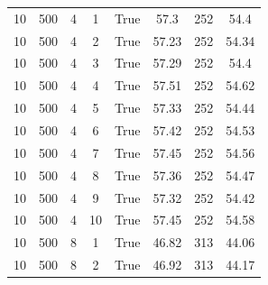 \begin{table}[H]
{\begin{tabular}{cccccccc}
			\midrule
			10            & 500                             & 4                        & 1            & True             & 57.3                   & 252           & 54.4              \\
			10            & 500                             & 4                        & 2            & True             & 57.23                  & 252           & 54.34             \\
			10            & 500                             & 4                        & 3            & True             & 57.29                  & 252           & 54.4              \\
			10            & 500                             & 4                        & 4            & True             & 57.51                  & 252           & 54.62             \\
			10            & 500                             & 4                        & 5            & True             & 57.33                  & 252           & 54.44             \\
			10            & 500                             & 4                        & 6            & True             & 57.42                  & 252           & 54.53             \\
			10            & 500                             & 4                        & 7            & True             & 57.45                  & 252           & 54.56             \\
			10            & 500                             & 4                        & 8            & True             & 57.36                  & 252           & 54.47             \\
			10            & 500                             & 4                        & 9            & True             & 57.32                  & 252           & 54.42             \\
			10            & 500                             & 4                        & 10           & True             & 57.45                  & 252           & 54.58             \\
			\midrule
			10            & 500                             & 8                        & 1            & True             & 46.82                  & 313           & 44.06             \\
			10            & 500                             & 8                        & 2            & True             & 46.92                  & 313           & 44.17             \\

\end{tabular}}
\end{table}
